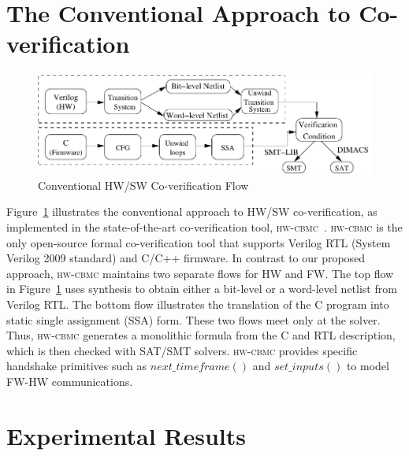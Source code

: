 \documentclass[sigconf]{acmart}
\newcommand{\rmcmt}[1]{{\color{magenta} [{#1}]}}
\newcommand{\tool}[1]{\textsc{#1}\xspace}
\newcommand{\hwcbmcv}{\tool{hw-cbmc}}
\newcommand{\Omit}[1]{}
\begin{document}

\Omit{
\rmcmt{
The hardware and firmware run independently of each other. 
The communication between them takes place through interrupts. 
The interrupts are modelled by function calls. 
}
}
%
\section{The Conventional Approach to Co-verification}
%
\begin{figure}[t]
\begin{center}
\includegraphics[scale=0.6]{figures/traditional_flow.pdf}
\caption{Conventional HW/SW Co-verification Flow}
\label{fig:conventional}
\end{center}
\end{figure}

Figure~\ref{fig:conventional} illustrates the conventional approach to HW/SW
co-veri\-fi\-cation, as implemented in the state-of-the-art co-verification
tool, \hwcbmcv~\cite{CKY03,vlsid13}.  \hwcbmcv is the only open-source
formal co-verification tool that supports Verilog RTL (System Verilog 2009
standard) and C/C++ firmware.  In contrast to our proposed approach,
\hwcbmcv maintains two separate flows for HW and FW.  The top flow in
Figure~\ref{fig:conventional} uses synthesis to obtain either a bit-level or
a word-level netlist from Verilog RTL.  The bottom flow illustrates the
translation of the C program into static single assignment (SSA) form. 
These two flows meet only at the solver.  Thus, \hwcbmcv generates a
monolithic formula from the C and RTL description, which is then checked
with SAT/SMT solvers.  \hwcbmcv provides specific handshake primitives such
as $next\_timeframe()$ and $set\_inputs()$ to model FW-HW communications.
%
\Omit{
The hardware and firmware run independently of each other. 
The communication between them takes place through these function calls. 
}

\section{Experimental Results}
\end{document}
